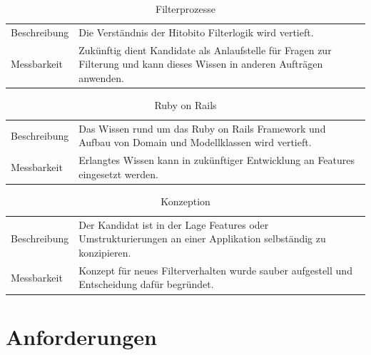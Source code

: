 \begin{table}[h!]
   \begin{tabular}{|L{0.4\textwidth}|L{0.5\textwidth}|}
       \hline
         \\[12pt]
       \hline
       Beschreibung & Die Verständnis der Hitobito Filterlogik wird vertieft. \\
       \hline
       Messbarkeit & Zukünftig dient Kandidate als Anlaufstelle für Fragen zur Filterung und
       kann dieses Wissen in anderen Aufträgen anwenden. \\
       \hline
     \end{tabular}
     \caption{Filterprozesse}
\end{table}

\begin{table}[h!]
   \begin{tabular}{|L{0.4\textwidth}|L{0.5\textwidth}|}
       \hline
         \\[12pt]
       \hline
       Beschreibung & Das Wissen rund um das Ruby on Rails Framework und Aufbau von Domain und Modellklassen 
       wird vertieft. \\
       \hline
       Messbarkeit & Erlangtes Wissen kann in zukünftiger Entwicklung an Features eingesetzt werden. \\
       \hline
     \end{tabular}
     \caption{Ruby on Rails}
\end{table}

\begin{table}[h!]
   \begin{tabular}{|L{0.4\textwidth}|L{0.5\textwidth}|}
       \hline
         \\[12pt]
       \hline
       Beschreibung & Der Kandidat ist in der Lage Features oder Umstrukturierungen an einer Applikation
       selbständig zu konzipieren. \\
       \hline
       Messbarkeit & Konzept für neues Filterverhalten wurde sauber aufgestell und Entscheidung dafür begründet.  \\
       \hline
     \end{tabular}
     \caption{Konzeption}
\end{table}

\section{Anforderungen}
